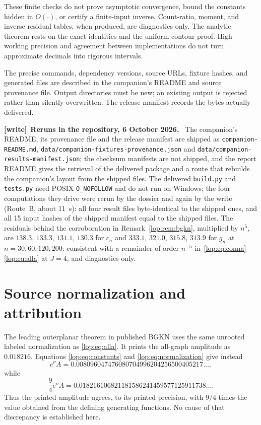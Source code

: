 \documentclass[11pt,letterpaper]{article}
\numberwithin{equation}{section}
\theoremstyle{remark}\newtheorem{remark}[theorem]{Remark}
\newcommand{\file}[1]{\nolinkurl{#1}}
\newenvironment{writenote}[1][]{\par\smallskip\begingroup\small
 \noindent\textbf{[write]}\if\relax\detokenize{#1}\relax\else~\textbf{#1.}\fi\ }%
 {\par\endgroup\smallskip}
\begin{document}
These finite checks do not prove asymptotic convergence, bound the
constants hidden in $O(\cdot)$, or certify a finite-input inverse.
Count-ratio, moment, and inverse residual tables, when produced, are
diagnostics only. The analytic theorem rests on the exact identities
and the uniform contour proof. High working precision and agreement
between implementations do not turn approximate decimals into rigorous
intervals.

The precise commands, dependency versions, source URLs, fixture hashes,
and generated files are described in the companion's README and source
provenance file. Output directories must be new; an existing output is
rejected rather than silently overwritten. The release manifest records
the bytes actually delivered.

\begin{writenote}[Reruns in the repository, 6 October 2026]
The companion's README, its provenance file and the release manifest are
shipped as \file{companion-README.md},
\file{data/companion-fixtures-provenance.json} and
\file{data/companion-results-manifest.json}; the checksum manifests are not
shipped, and the report README gives the retrieval of the delivered package
and a route that rebuilds the companion's layout from the shipped files.
The delivered \file{build.py} and \file{tests.py} need POSIX
\texttt{O\_NOFOLLOW} and do not run on Windows; the four computations they
drive were rerun by the dossier and again by the write (Route~B, about
11~s): all four result files byte-identical to the shipped ones, and all 15
input hashes of the shipped manifest equal to the shipped files. The
residuals behind the corroboration in Remark~\ref{lop:rem:bgkn}, multiplied
by $n^5$, are $138.3$, $133.3$, $131.1$, $130.3$ for $c_n$ and $333.1$,
$321.0$, $315.8$, $313.9$ for $g_n$ at $n=30,60,120,200$: consistent with
a remainder of order $n^{-5}$ in~\eqref{lop:eq:conna}--\eqref{lop:eq:alla}
at $J=4$, and diagnostics only.
\end{writenote}

\section{Source normalization and attribution}\label{lop:sec:sources}

The leading outerplanar theorem in published BGKN
\cite[Theorem 5.1, pp.~2102--2103]{bgkn} uses the same unrooted labeled
normalization as \eqref{lop:eq:alla}. It prints the all-graph amplitude as
$0.018216$. Equations \eqref{lop:eq:constants} and \eqref{lop:eq:normalization}
give instead
\[
 e^\nu A=0.008096047476080704996204256500405217\ldots,
\]
while
\[
 \frac94e^\nu A=0.018216106821181586241459577125911738\ldots.
\]
Thus the printed amplitude agrees, to its printed precision, with
$9/4$ times the value obtained from the defining generating functions.
No cause of that discrepancy is established here.
\end{document}
